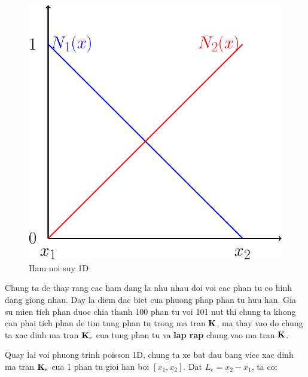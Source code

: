 \begin{figure}[htbp]
    \centering
    \includegraphics[width=0.3\linewidth]{Tuan6/figure/shape_func.pdf}
    \caption{Ham noi suy 1D}
    \label{fig_shape_func}
\end{figure}

Chung ta de thay rang cac ham dang la nhu nhau doi voi cac phan tu co hinh dang giong nhau. Day la diem dac biet cua phuong phap phan tu huu han. Gia su mien tich phan duoc chia thanh 100 phan tu voi 101 nut thi chung ta khong can phai tich phan de tim tung phan tu trong ma tran ${\bf K}$, ma thay vao do chung ta xac dinh ma tran ${\bf K}_e$ cua tung phan tu va \textbf{lap rap} chung vao ma tran ${\bf K}$.

Quay lai voi phuong trinh poisson 1D, chung ta xe bat dau bang viec xac dinh ma tran ${\bf K}_e$ cua 1 phan tu gioi han boi $[x_1, x_2]$. Dat $L_e = x_2 -x_1$, ta co:


